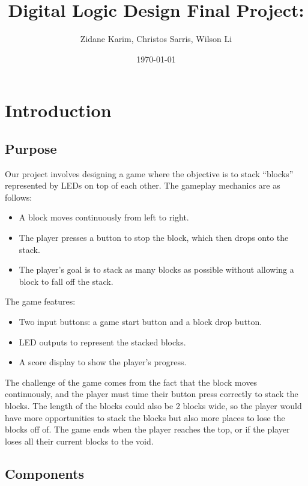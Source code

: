 \documentclass{article}
\title{Digital Logic Design Final Project: }
\author{Zidane Karim, Christos Sarris, Wilson Li}
\date{\today}
\begin{document}
 
    \maketitle 

    \section{Introduction}
    \subsection{Purpose}
    
    Our project involves designing a game where the objective is to stack ``blocks'' represented by LEDs on top of each other. The gameplay mechanics are as follows:

    \begin{itemize}
        \item A block moves continuously from left to right.
        \item The player presses a button to stop the block, which then drops onto the stack.
        \item The player's goal is to stack as many blocks as possible without allowing a block to fall off the stack.
    \end{itemize}

    The game features:
    \begin{itemize}
        \item Two input buttons: a game start button and a block drop button.
        \item LED outputs to represent the stacked blocks.
        \item A score display to show the player's progress.
    \end{itemize}
    
    The challenge of the game comes from the fact that the block moves continuously, and the player must time their button press correctly to stack the blocks. 
    The length of the blocks could also be 2 blocks wide, so the player would have more opportunities to stack the blocks but also more places to lose the blocks off of. 
    The game ends when the player reaches the top, or if the player loses all their current blocks to the void.  

    \subsection{Components}
\end{document}
